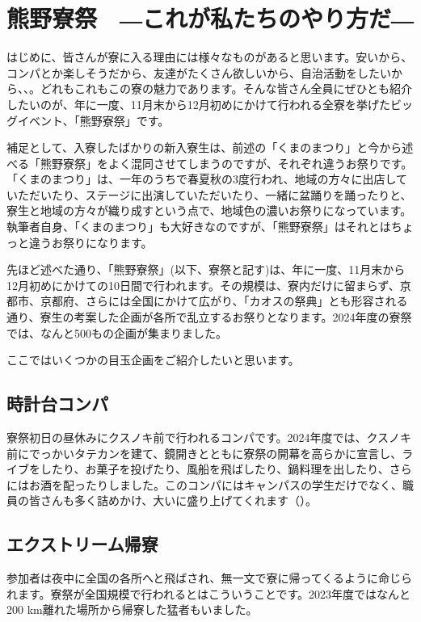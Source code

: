 

\section{熊野寮祭　―これが私たちのやり方だ―}\label{sec:ryosai}

\subsecnomaru

 はじめに、皆さんが寮に入る理由には様々なものがあると思います。安いから、コンパとか楽しそうだから、友達がたくさん欲しいから、自治活動をしたいから、、。どれもこれもこの寮の魅力であります。そんな皆さん全員にぜひとも紹介したいのが、年に一度、11月末から12月初めにかけて行われる全寮を挙げたビッグイベント、「熊野寮祭」です。

 補足として、入寮したばかりの新入寮生は、前述の「くまのまつり」と今から述べる「熊野寮祭」をよく混同させてしまうのですが、それぞれ違うお祭りです。「くまのまつり」は、一年のうちで春夏秋の3度行われ、地域の方々に出店していただいたり、ステージに出演していただいたり、一緒に盆踊りを踊ったりと、寮生と地域の方々が織り成すという点で、地域色の濃いお祭りになっています。執筆者自身、「くまのまつり」も大好きなのですが、「熊野寮祭」はそれとはちょっと違うお祭りになります。

 先ほど述べた通り、「熊野寮祭」(以下、寮祭と記す)は、年に一度、11月末から12月初めにかけての10日間で行われます。その規模は、寮内だけに留まらず、京都市、京都府、さらには全国にかけて広がり、「カオスの祭典」とも形容される通り、寮生の考案した企画が各所で乱立するお祭りとなります。2024年度の寮祭では、なんと500もの企画が集まりました。\par ここではいくつかの目玉企画をご紹介したいと思います。



\subsection{時計台コンパ}
寮祭初日の昼休みにクスノキ前で行われるコンパです。2024年度では、クスノキ前にでっかいタテカンを建て、鏡開きとともに寮祭の開幕を高らかに宣言し、ライブをしたり、お菓子を投げたり、風船を飛ばしたり、鍋料理を出したり、さらにはお酒を配ったりしました。このコンパにはキャンパスの学生だけでなく、職員の皆さんも多く詰めかけ、大いに盛り上げてくれます（）。


\subsection{エクストリーム帰寮}
参加者は夜中に全国の各所へと飛ばされ、無一文で寮に帰ってくるように命じられます。寮祭が全国規模で行われるとはこういうことです。2023年度ではなんと200 km離れた場所から帰寮した猛者もいました。




